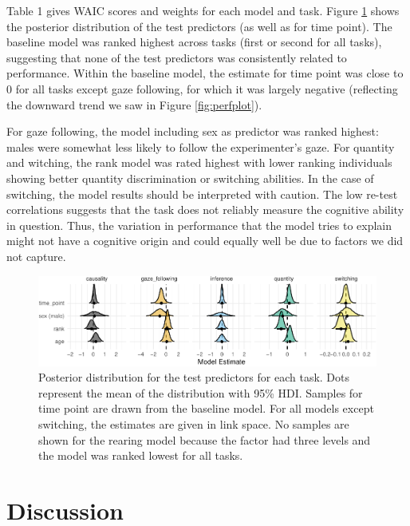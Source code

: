 \documentclass[10pt, letterpaper]{article}
\newenvironment{CodeChunk}{}{}
\begin{document}
Table 1 gives WAIC scores and weights for each model and task. Figure
\ref{fig:predplot} shows the posterior distribution of the test
predictors (as well as for time point). The baseline model was ranked
highest across tasks (first or second for all tasks), suggesting that
none of the test predictors was consistently related to performance.
Within the baseline model, the estimate for time point was close to 0
for all tasks except gaze following, for which it was largely negative
(reflecting the downward trend we saw in Figure \ref{fig:perfplot}).

For gaze following, the model including sex as predictor was ranked
highest: males were somewhat less likely to follow the experimenter's
gaze. For quantity and witching, the rank model was rated highest with
lower ranking individuals showing better quantity discrimination or
switching abilities. In the case of switching, the model results should
be interpreted with caution. The low re-test correlations suggests that
the task does not reliably measure the cognitive ability in question.
Thus, the variation in performance that the model tries to explain might
not have a cognitive origin and could equally well be due to factors we
did not capture.

\begin{CodeChunk}
\begin{figure}[h]

{\centering \includegraphics{figs/predplot-1} 

}

\caption[Posterior distribution for the test predictors for each task]{Posterior distribution for the test predictors for each task. Dots represent the mean of the distribution with 95\% HDI. Samples for time point are drawn from the baseline model. For all models except switching, the estimates are given in link space. No samples are shown for the rearing model because the factor had three levels and the model was ranked lowest for all tasks.}\label{fig:predplot}
\end{figure}
\end{CodeChunk}

\hypertarget{discussion}{%
\section{Discussion}\label{discussion}}
\end{document}
